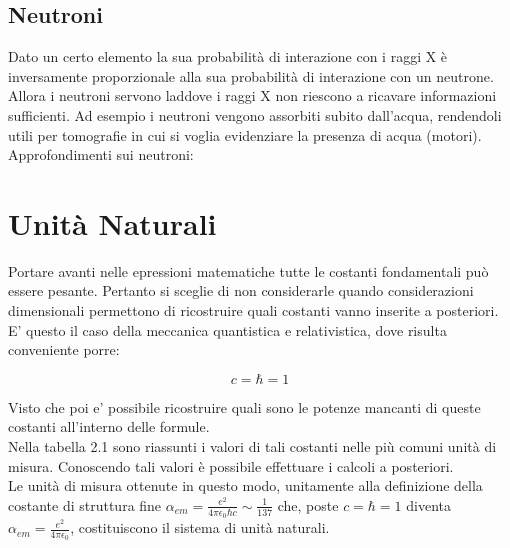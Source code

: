 \documentclass [a4paper, twoside] {book}
\begin{document}
\section{Neutroni}

Dato un certo elemento la sua probabilità di interazione con i raggi X è inversamente proporzionale alla sua probabilità di interazione con un neutrone. Allora i neutroni servono laddove i raggi X non riescono a ricavare informazioni sufficienti.
Ad esempio i neutroni vengono assorbiti subito dall'acqua, rendendoli utili per tomografie in cui si voglia evidenziare la presenza di acqua (motori). \\
Approfondimenti sui neutroni: \cite{Corvisiero} \cite{Assay}



\chapter{Unità Naturali}

Portare avanti nelle epressioni matematiche tutte le costanti fondamentali può essere pesante. Pertanto si sceglie di non considerarle quando considerazioni dimensionali permettono di ricostruire quali costanti vanno inserite a posteriori. E' questo il caso della meccanica quantistica e relativistica, dove risulta conveniente porre:

\begin{equation}
c=\hbar=1
\end{equation}

Visto che poi e' possibile ricostruire quali sono le potenze mancanti di queste costanti all'interno delle formule.\\

Nella tabella 2.1 sono riassunti i valori di tali costanti nelle più comuni unità di misura. Conoscendo tali valori è possibile effettuare i calcoli a posteriori.\\
Le unità di misura ottenute in questo modo, unitamente alla definizione della costante di struttura fine $\alpha_{em}=\frac{e^2}{4\pi\epsilon_0\hbar c}\sim\frac{1}{137}$ che, poste $c=\hbar=1$ diventa $\alpha_{em}=\frac{e^2}{4\pi\epsilon_0}$, costituiscono il sistema di unità naturali.
\end{document}
